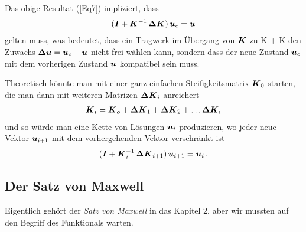\begin{remark}
Das obige Resultat (\ref{Eq7}) impliziert, dass
\begin{align}\label{Eq162}
(\mbox{\boldmath $I$} + \mbox{\boldmath $K$}^{-1}\,\mbox{\boldmath $\Delta$} \mbox{\boldmath $K$})\,\mbox{\boldmath $u$}_c = \mbox{\boldmath $u$}
\end{align}
gelten muss, was bedeutet, dass ein Tragwerk im \"{U}bergang von  $\mbox{\boldmath $K$}$ zu \vek K + \vek \Delta \vek K den Zuwachs $\mbox{\boldmath $\Delta$} \mbox{\boldmath $u$} = \mbox{\boldmath $u$}_c - \mbox{\boldmath $u$}$ nicht frei w\"{a}hlen kann, sondern dass der neue Zustand $\mbox{\boldmath $u$}_c$ mit dem vorherigen Zustand $\mbox{\boldmath $u$}$ kompatibel sein muss.

Theoretisch  k\"{o}nnte man mit einer ganz einfachen Steifigkeitsmatrix  $\mbox{\boldmath $K$}_0$ starten, die man dann mit weiteren Matrizen $\mbox{\boldmath $\Delta$} \mbox{\boldmath $K$}_i$ anreichert
\begin{align}
\mbox{\boldmath $K$}_i = \mbox{\boldmath $K$}_o + \mbox{\boldmath $\Delta$} \mbox{\boldmath $K$}_1 + \mbox{\boldmath $\Delta$} \mbox{\boldmath $K$}_2 + \ldots \mbox{\boldmath $\Delta$} \mbox{\boldmath $K$}_i
\end{align}
und so w\"{u}rde man eine Kette von L\"{o}sungen $\mbox{\boldmath $u$}_i$ produzieren, wo jeder neue Vektor $\mbox{\boldmath $u$}_{i + 1}$ mit dem vorhergehenden Vektor verschr\"{a}nkt ist
\begin{align}\label{Eq163}
(\mbox{\boldmath $I$} + \mbox{\boldmath $K$}_i^{-1}\,\mbox{\boldmath $\Delta$}\mbox{\boldmath $K$}_{i + 1})\,\mbox{\boldmath $u$}_{i + 1} = \mbox{\boldmath $u$}_i\,.
\end{align}
\end{remark}


{\textcolor{sectionTitleBlue}{\section{Der Satz von Maxwell}}}\label{Maxwell}
Eigentlich geh\"{o}rt der {\em Satz von Maxwell\/} in das Kapitel 2, aber wir mussten auf den Begriff des Funktionals warten.

